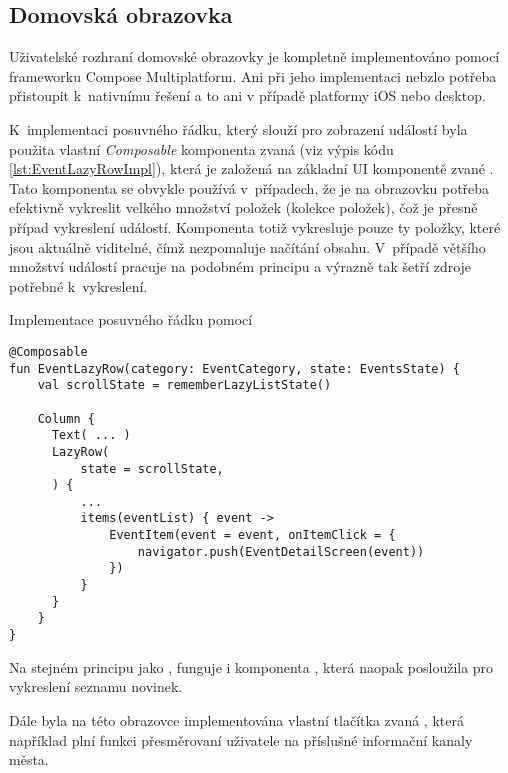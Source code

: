 \subsection{Domovská obrazovka}
Uživatelské rozhraní domovské obrazovky je kompletně implementováno pomocí frameworku Compose Multiplatform. Ani při jeho implementaci nebzlo potřeba
přistoupit k~nativnímu řešení a to ani v případě platformy iOS nebo desktop.

K~implementaci posuvného řádku, který slouží pro zobrazení událostí byla použita vlastní \textit{Composable} komponenta zvaná  
(viz výpis kódu \ref{lst:EventLazyRowImpl}),
která je založená na základní UI komponentě zvané . Tato komponenta se obvykle používá v~případech, že je na obrazovku potřeba efektivně 
vykreslit velkého množství položek (kolekce položek), čož je přesně případ vykreslení událostí. Komponenta  totiž vykresluje pouze ty položky,
které jsou aktuálně viditelné, čímž nezpomaluje načítání obsahu. V~případě většího množství událostí pracuje na podobném principu a výrazně tak šetří zdroje potřebné k~vykreslení.

\begin{listing}[H]
\caption{Implementace posuvného řádku pomocí }\label{lst:EventLazyRowImpl}
\begin{verbatim}
@Composable
fun EventLazyRow(category: EventCategory, state: EventsState) {
    val scrollState = rememberLazyListState()

    Column {
      Text( ... )
      LazyRow(
          state = scrollState,
      ) {
          ...
          items(eventList) { event ->
              EventItem(event = event, onItemClick = {
                  navigator.push(EventDetailScreen(event))
              })
          }
      }
    }
}  
\end{verbatim}
\end{listing}

Na stejném principu jako , funguje i komponenta , která naopak posloužila pro vykreslení seznamu novinek.

Dále byla na této obrazovce implementována vlastní tlačítka zvaná , která například plní funkci přesměrovaní uživatele na 
příslušné informační kanaly města.  



